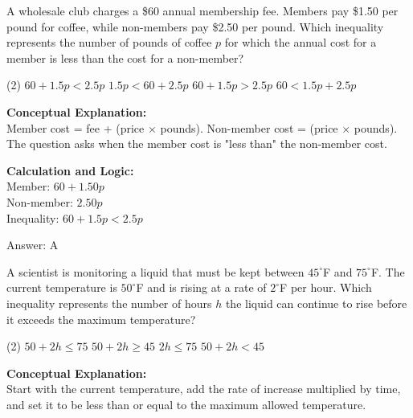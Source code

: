 \documentclass[11pt,paper=a4,answers]{exam}
\begin{document}
\begin{questions}
\vspace{20pt}

\question
A wholesale club charges a \$60 annual membership fee. Members pay \$1.50 per pound for coffee, while non-members pay \$2.50 per pound. Which inequality represents the number of pounds of coffee $p$ for which the annual cost for a member is less than the cost for a non-member?
\begin{tasks}(2)
    \task $60 + 1.5p < 2.5p$
    \task $1.5p < 60 + 2.5p$
    \task $60 + 1.5p > 2.5p$
    \task $60 < 1.5p + 2.5p$
\end{tasks}

\begin{solution}
\textbf{Conceptual Explanation:} \\
Member cost = fee + (price $\times$ pounds). Non-member cost = (price $\times$ pounds). The question asks when the member cost is "less than" the non-member cost.

\vspace{10pt}
\textbf{Calculation and Logic:} \\
Member: $60 + 1.50p$ \\
Non-member: $2.50p$ \\
Inequality: $60 + 1.5p < 2.5p$

\vspace{15pt}
Answer: \colorbox{yellow!100}{A}
\end{solution}

\vspace{20pt}

\question
A scientist is monitoring a liquid that must be kept between $45^\circ$F and $75^\circ$F. The current temperature is $50^\circ$F and is rising at a rate of $2^\circ$F per hour. Which inequality represents the number of hours $h$ the liquid can continue to rise before it exceeds the maximum temperature?
\begin{tasks}(2)
    \task $50 + 2h \le 75$
    \task $50 + 2h \ge 45$
    \task $2h \le 75$
    \task $50 + 2h < 45$
\end{tasks}

\begin{solution}
\textbf{Conceptual Explanation:} \\
Start with the current temperature, add the rate of increase multiplied by time, and set it to be less than or equal to the maximum allowed temperature.


\end{solution}
\end{questions}
\end{document}
